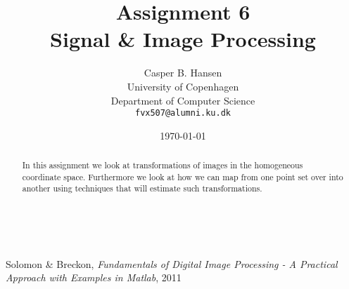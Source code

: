 \documentclass[11pt]{article}
\title
{
    {\Large Assignment 6} \\
    Signal \& Image Processing
}
\author
{
    Casper B. Hansen \\
    University of Copenhagen \\
    Department of Computer Science \\
    {\tt fvx507@alumni.ku.dk}
}
\date{\today}
\begin{document}
\maketitle
\thispagestyle{empty}
\begin{multicols}{2}
    \begin{abstract}
        In this assignment we look at transformations of images in the
        homogeneous coordinate space. Furthermore we look at how we can map
        from one point set over into another using techniques that will
        estimate such transformations.
    \end{abstract}
    \vfill{\ }\columnbreak
    \tableofcontents
\end{multicols}
\clearpage



%


\appendix


\begin{thebibliography}{9}

    Solomon \& Breckon,
    \emph{Fundamentals of Digital Image Processing - A Practical Approach with
    Examples in Matlab},
    2011

\end{thebibliography}
\end{document}
